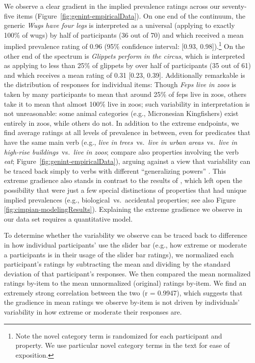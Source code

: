 \documentclass[floatsintext,doc]{apa6}
\let\rmarkdownfootnote\footnote%
\def\footnote{\protect\rmarkdownfootnote}
\newcommand{\ndg}[1]{{\textcolor{Green}{[ndg: #1]}}}
\begin{document}
We observe a clear gradient in the implied prevalence ratings across our seventy-five items (Figure~\ref{fig:genint-empiricalData}).
On one end of the continuum, the generic \emph{Wugs have four legs} is interpreted as a universal (applying to exactly 100\% of wugs) by half of participants (36 out of 70) and which received a mean implied prevalence rating of 0.96 (95\% confidence interval: [0.93, 0.98]).\footnote{Note the novel category term is randomized for each participant and property. We use particular novel category terms in the text for ease of exposition.}
On the other end of the spectrum is \emph{Glippets perform in the circus}, which is interpreted as applying to less than 25\% of glippets by over half of participants (35 out of 61) and which receives a mean rating of 0.31 [0.23, 0.39].
Additionally remarkable is the distribution of responses for individual items: Though \emph{Feps live in zoos} is taken by many participants to mean that around 25\% of feps live in zoos, others take it to mean that almost 100\% live in zoos; such variability in interpretation is not unreasonable: some animal categories (e.g., Micronesian Kingfishers) exist entirely in zoos, while others do not.
In addition to the extreme endpoints, we find average ratings at all levels of prevalence in between, even for predicates that have the same main verb (e.g., \emph{live in} \emph{trees}~vs.~\emph{live in urban areas}~vs.~\emph{live in high-rise buildings}~vs.~\emph{live in zoos}; compare also properties involving the verb \emph{eat}; Figure~\ref{fig:genint-empiricalData}), arguing against a view that variability can be traced back simply to verbs with different ``generalizing powers'' \cite{Abelson1966, Cimpian2010}.
This extreme gradience also stands in contrast to the results of , which left open the possibility that were just a few special distinctions of properties that had unique implied prevalences (e.g., biological~vs.~accidental properties; see also Figure \ref{fig:cimpian-modelingResults}). 
Explaining the extreme gradience we observe in our data set requires a quantitative model. 


To determine whether the variability we observe can be traced back to difference in how individual participants' use the slider bar (e.g., how extreme or moderate a participants is in their usage of the slider bar ratings), we normalized each participant's ratings by subtracting the mean and dividing by the standard deviation of that participant's responses. We then compared the mean normalized ratings by-item to the mean unnormalized (original) ratings by-item. We find an extremely strong correlation between the two (r = 0.9947), which suggests that the gradience in mean ratings we observe by-item is not driven by individuals’ variability in how extreme or moderate their responses are.
\end{document}
